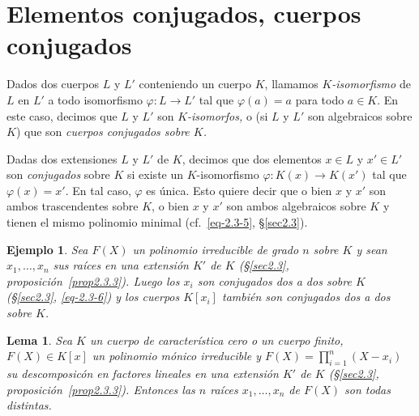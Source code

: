 \documentclass[10pt,oneside,bibtotoc,smallheadings,leqno,a5paper,DIV=12]{scrbook}
\renewcommand{\to}[1][]{\xrightarrow{#1}}
\numberwithin{equation}{section}
\theoremstyle{defi}
\theoremstyle{enonce}
\newtheorem*{lemma*}{Lema}
\theoremstyle{rem}
\newtheorem*{example*}{Ejemplo}
\numberwithin{theorem}{section}
\numberwithin{proposition}{section}
\numberwithin{definition}{section}
\numberwithin{lemma}{section}
\numberwithin{corollary}{section}
\numberwithin{example}{section}
\numberwithin{footnote}{section}%
\begin{document}
\section{Elementos conjugados, cuerpos conjugados}\label{sec2.4}

Dados dos cuerpos $L$ y $L'$ conteniendo un cuerpo $K$, llamamos {\em $K$-isomorfismo} de $L$ en $L'$
a todo isomorfismo $\varphi:L\to L'$ tal que $\varphi(a) = a$ para todo $a\in K$. En este caso, decimos que
$L$ y $L'$ son {\em $K$-isomorfos,} o (si $L$ y $L'$ son algebraicos sobre $K$) que son {\em cuerpos conjugados
sobre $K$.}

Dadas dos extensiones $L$ y $L'$ de $K$, decimos que dos elementos $x\in L$ y $x'\in L'$ son {\em conjugados}
sobre $K$ si existe un $K$-isomorfismo $\varphi:K(x)\to K(x')$ tal que $\varphi(x) = x'$. En tal caso,
$\varphi$ es \'unica. Esto quiere decir que o bien $x$ y $x'$ son ambos trascendentes sobre $K$,
o bien $x$ y $x'$ son ambos algebraicos sobre $K$ y tienen el mismo polinomio minimal (cf.~\eqref{eq-2.3-5}, \S\ref{sec2.3}).

\begin{example*}
Sea $F(X)$ un polinomio \emph{irreducible} de grado $n$ sobre $K$ y sean
$x_{1},\dots,x_{n}$ sus ra\'ices en una extensi\'on $K'$ de $K$ (\S\ref{sec2.3}, proposici\'on~\ref{prop2.3.3}). Luego los $x_{i}$
son conjugados dos a dos sobre $K$ (\S\ref{sec2.3}, \eqref{eq-2.3-6}) y los cuerpos $K[x_{i}]$ tambi\'en son conjugados
dos a dos sobre $K$.
\end{example*}

\begin{lemma*}
Sea $K$ un cuerpo de caracter\'istica cero o un cuerpo finito, $F(X)\in K[x]$ un polinomio m\'onico
irreducible y $F(X) = \prod_{i=1}^{n}(X-x_{i})$ su descomposic\'on en factores lineales en una extensi\'on
$K'$ de $K$ (\S\ref{sec2.3}, proposici\'on~\ref{prop2.3.3}). Entonces
las $n$ ra\'ices $x_{1},\dots,x_{n}$ de $F(X)$ son todas distintas.
\end{lemma*}
\end{document}
